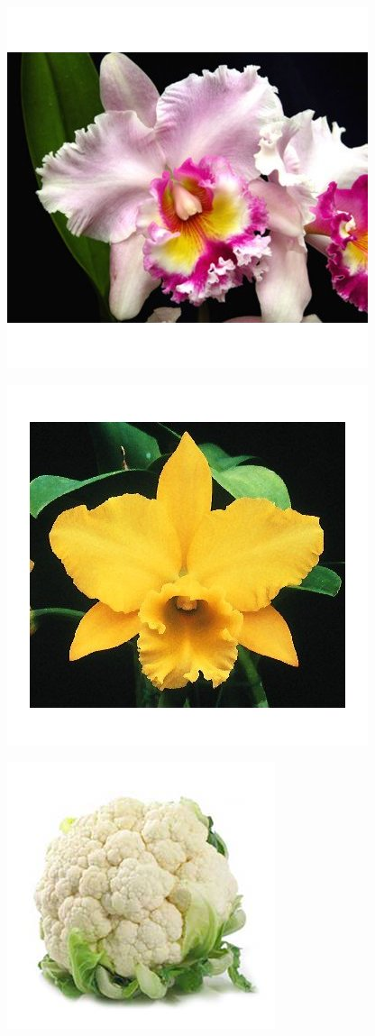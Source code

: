 \documentclass{article}
\begin{document}
\begin{center}
\includegraphics[height=0.9\textheight, angle=90]{../Cattleya2.jpg}
\end{center}
\newpage

\begin{center}
\includegraphics[height=0.9\textheight, angle=90]{../Cattleya3.jpg}
\end{center}
\newpage

\begin{center}
\includegraphics[height=0.9\textheight, angle=90]{../Cauliflower.jpg}
\end{center}
\newpage
\end{document}
